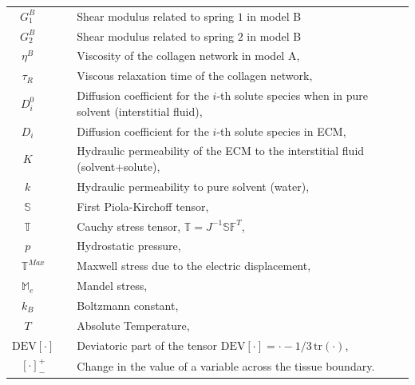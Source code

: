 \documentclass[runningheads]{llncs}
\newcommand{\F}{\ensuremath{\mathbb{F}}}
\begin{document}
\begin{table}[h!]
\begin{tabular}{c  l}
	$G^B_1\qquad$ & Shear modulus related to spring $1$ in model B\\
	$G^B_2\qquad$ & Shear modulus related to spring $2$ in model B\\
	$\eta^B\qquad$ & Viscosity of the collagen network in model A,\\
	$\tau_R\qquad$ & Viscous relaxation time of the collagen network,\\
	$D^0_i\qquad$ & Diffusion coefficient for the $i$-th solute species when in pure solvent (interstitial fluid),\\
	$D_i\qquad$ & Diffusion coefficient for the $i$-th solute species in ECM,\\
	$K\qquad$ &  Hydraulic permeability of the ECM to the interstitial fluid (solvent+solute),\\
	$k\qquad$ &  Hydraulic  permeability  to  pure  solvent (water),\\
	$\mathbb{S}\qquad$ & First Piola-Kirchoff tensor,\\
	$\mathbb{T}\qquad$ & Cauchy stress tensor, $\mathbb{T}=J^{-1}\mathbb{S}\F^T$,\\
	$p\qquad$ & Hydrostatic pressure,\\
	$\mathbb{T}^{Max}\quad$ & Maxwell stress due to the electric displacement,\\
	$\mathbb{M}_e\qquad$ & Mandel stress,\\
	$k_B\qquad$ & Boltzmann constant,\\
	$T\qquad$ & Absolute Temperature, \\
	$\text{DEV}\left[\cdot\right]\quad$ & Deviatoric part of the tensor $\text{DEV}\left[\cdot\right] = \cdot-1/3\, \text{tr}(\cdot)$,\\[2pt]
	$\left[\cdot\right]^+_-\quad$ &  Change in the value of a variable across the tissue boundary.
\end{tabular}	
\end{table}
\newpage
\end{document}
